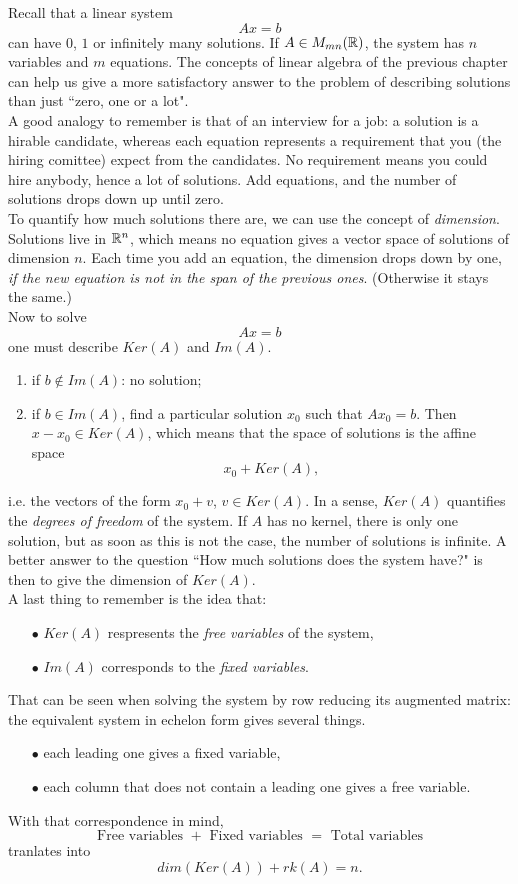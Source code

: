Recall that a linear system \[Ax = b\] can have $0$, $1$ or infinitely many solutions. If $A\in M_{mn}(\mathbb R)$, the system has $n$ variables and $m$ equations. The concepts of linear algebra of the previous chapter can help us give a more satisfactory answer to the problem of describing solutions than just ``zero, one or a lot".\\

A good analogy to remember is that of an interview for a job: a solution is a hirable candidate, whereas each equation represents a requirement that you (the hiring comittee) expect from the candidates. No requirement means you could hire anybody, hence a lot of solutions. Add equations, and the number of solutions drops down up until zero. \\

To quantify how much solutions there are, we can use the concept of \textit{dimension}. Solutions live in $\mathbb R^n$, which means no equation gives a vector space of solutions of dimension $n$. Each time you add an equation, the dimension drops down by one, \textit{if the new equation is not in the span of the previous ones}. (Otherwise it stays the same.)\\

Now to solve \[Ax=b\]
one must describe $Ker(A)$ and $Im(A)$. 
\begin{enumerate}
\item if $b\notin Im(A)$: no solution;
\item if $b\in Im(A)$, find a particular solution $x_0$ such that $A x_0=b $. Then $x-x_0\in Ker(A)$, which means that the space of solutions is the affine space
\[x_0 + Ker(A),\]
\end{enumerate}
i.e. the vectors of the form $x_0+v$, $v\in Ker(A)$. In a sense, $Ker(A)$ quantifies the \textit{degrees of freedom} of the system. If $A$ has no kernel, there is only one solution, but as soon as this is not the case, the number of solutions is infinite. A better answer to the question ``How much solutions does the system have?" is then to give the dimension of $Ker(A)$.\\

A last thing to remember is the idea that:
\begin{itemize}
\item[$\bullet$] $Ker(A)$ respresents the \textit{free variables} of the system,
\item[$\bullet$] $Im(A)$ corresponds to the \textit{fixed variables}.
\end{itemize}
That can be seen when solving the system by row reducing its augmented matrix: the equivalent system in echelon form gives several things.
\begin{itemize}
\item[$\bullet$] each leading one gives a fixed variable,
\item[$\bullet$] each column that does not contain a leading one gives a free variable.
\end{itemize}
With that correspondence in mind,
\[ \text{Free variables } + \text{ Fixed variables } = \text{ Total variables} \]
tranlates into
\[dim( Ker(A)) + rk(A) =n .\]
 
